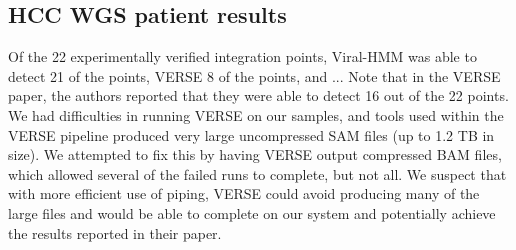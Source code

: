 \documentclass{bioinfo}
\begin{document}

\subsection{HCC WGS patient results}
Of the 22 experimentally verified integration points, Viral-HMM was able to detect 21 of the points, VERSE 8 of the points, and ...  Note that in the VERSE paper, the authors reported that they were able to detect 16 out of the 22 points.  We had difficulties in running VERSE on our samples, and tools used within the VERSE pipeline produced very large uncompressed SAM files (up to 1.2 TB in size).  We attempted to fix this by having VERSE output compressed BAM files, which allowed several of the failed runs to complete, but not all.  We suspect that with more efficient use of piping, VERSE could avoid producing many of the large files and would be able to complete on our system and potentially achieve the results reported in their paper.
\end{document}
